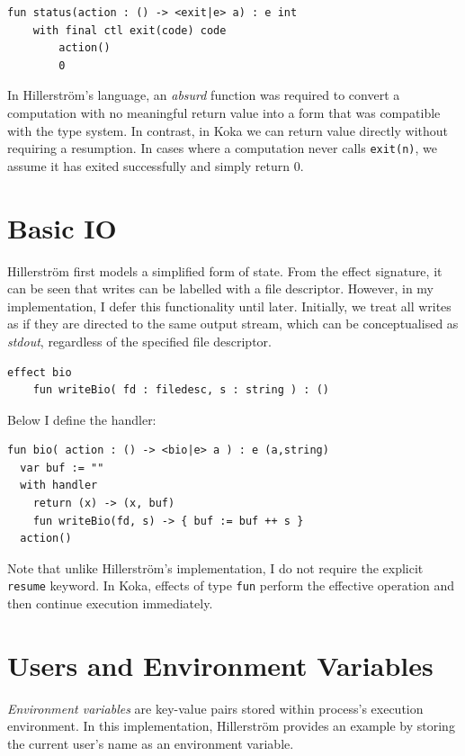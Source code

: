 \documentclass[logo,bsc,singlespacing,parskip]{infthesis}
\begin{document}
\begin{lstlisting}
fun status(action : () -> <exit|e> a) : e int
    with final ctl exit(code) code
        action()
        0
\end{lstlisting}
In Hillerström’s language, an \textit{absurd} function was required to convert a computation with no meaningful return value into a form that was compatible with the type system. In contrast, in Koka we can return value directly without requiring a resumption. In cases where a computation never calls \lstinline{exit(n)}, we assume it has exited successfully and simply return 0.

\section{Basic IO}
Hillerström first models a simplified form of state. From the effect signature, it can be seen that writes can be labelled with a file descriptor. However, in my implementation, I defer this functionality until later. Initially, we treat all writes as if they are directed to the same output stream, which can be conceptualised as \textit{stdout}, regardless of the specified file descriptor.

\begin{lstlisting}
effect bio
    fun writeBio( fd : filedesc, s : string ) : ()
\end{lstlisting}
\vspace{1em}
Below I define the handler:

\begin{lstlisting}
fun bio( action : () -> <bio|e> a ) : e (a,string)
  var buf := ""    
  with handler
    return (x) -> (x, buf)
    fun writeBio(fd, s) -> { buf := buf ++ s }
  action()
\end{lstlisting}

Note that unlike Hillerström’s implementation, I do not require the explicit \lstinline{resume} keyword. In Koka, effects of type \lstinline{fun} perform the effective operation and then continue execution immediately.

\section{Users and Environment Variables}
\textit{Environment variables} are key-value pairs stored within process's execution environment. In this implementation, Hillerström provides an example by storing the current user's name as an environment variable.
\end{document}

